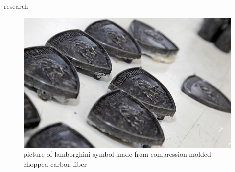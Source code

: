 \documentclass[
  letterpaper,
  ignorenonframetext,
  aspectratio=43,
  handout,
  12pt]{beamer}
\let\Oldincludegraphics\includegraphics
\renewcommand{\includegraphics}[2][]{\Oldincludegraphics[width=\textwidth,height=0.7\textheight,keepaspectratio]{#2}}
\begin{document}
\begin{frame}{research}
\protect\hypertarget{research-1}{}
\begin{figure}
\centering
\includegraphics{../images/lamborghini-chopped-fiber-badges-rough.jpg}
\caption{picture of lamborghini symbol made from compression molded
chopped carbon fiber}
\end{figure}
\end{frame}
\end{document}
